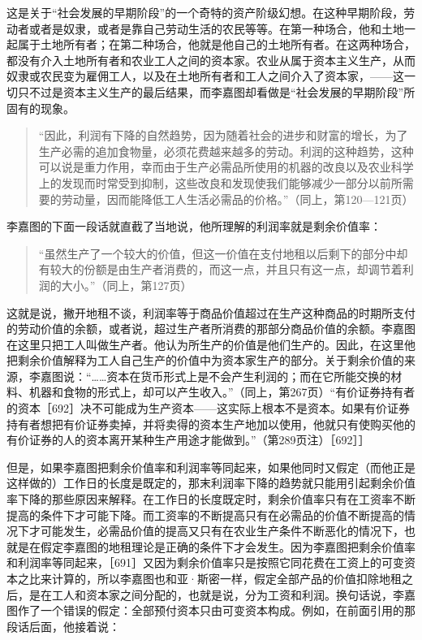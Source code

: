 这是关于“社会发展的早期阶段”的一个奇特的资产阶级幻想。在这种早期阶段，劳动者或者是奴隶，或者是靠自己劳动生活的农民等等。在第一种场合，他和土地一起属于土地所有者；在第二种场合，他就是他自己的土地所有者。在这两种场合，都没有介入土地所有者和农业工人之间的资本家。农业从属于资本主义生产，从而奴隶或农民变为雇佣工人，以及在土地所有者和工人之间介入了资本家，——这一切只不过是资本主义生产的最后结果，而李嘉图却看做是“社会发展的早期阶段”所固有的现象。

\begin{quote}{“因此，利润有下降的自然趋势，因为随着社会的进步和财富的增长，为了生产必需的追加食物量，必须花费越来越多的劳动。利润的这种趋势，这种可以说是重力作用，幸而由于生产必需品所使用的机器的改良以及农业科学上的发现而时常受到抑制，这些改良和发现使我们能够减少一部分以前所需要的劳动量，因而能降低工人生活必需品的价格。”（同上，第120—121页）}\end{quote}

李嘉图的下面一段话就直截了当地说，他所理解的利润率就是剩余价值率：

\begin{quote}{“虽然生产了一个较大的价值，但这一价值在支付地租以后剩下的部分中却有较大的份额是由生产者消费的，而这一点，并且只有这一点，却调节着利润的大小。”（同上，第127页）}\end{quote}

这就是说，撇开地租不谈，利润率等于商品价值超过在生产这种商品的时期所支付的劳动价值的余额，或者说，超过生产者所消费的那部分商品价值的余额。李嘉图在这里只把工人叫做生产者。他认为所生产的价值是他们生产的。因此，在这里他把剩余价值解释为工人自己生产的价值中为资本家生产的部分。关于剩余价值的来源，李嘉图说：“……资本在货币形式上是不会产生利润的；而在它所能交换的材料、机器和食物的形式上，却可以产生收入。”（同上，第267页）“有价证券持有者的资本［692］决不可能成为生产资本——这实际上根本不是资本。如果有价证券持有者想把有价证券卖掉，并将卖得的资本生产地加以使用，他就只有使购买他的有价证券的人的资本离开某种生产用途才能做到。”（第289页注）［692］］

但是，如果李嘉图把剩余价值率和利润率等同起来，如果他同时又假定（而他正是这样做的）工作日的长度是既定的，那末利润率下降的趋势就只能用引起剩余价值率下降的那些原因来解释。在工作日的长度既定时，剩余价值率只有在工资率不断提高的条件下才可能下降。而工资率的不断提高只有在必需品的价值不断提高的情况下才可能发生，必需品价值的提高又只有在农业生产条件不断恶化的情况下，也就是在假定李嘉图的地租理论是正确的条件下才会发生。因为李嘉图把剩余价值率和利润率等同起来，［691］又因为剩余价值率只是按照它同花费在工资上的可变资本之比来计算的，所以李嘉图也和亚·斯密一样，假定全部产品的价值扣除地租之后，是在工人和资本家之间分配的，也就是说，分为工资和利润。换句话说，李嘉图作了一个错误的假定：全部预付资本只由可变资本构成。例如，在前面引用的那段话后面，他接着说：

